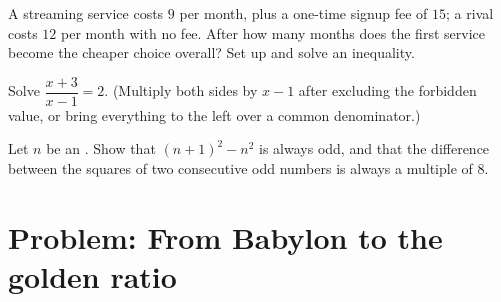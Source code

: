 \begin{exercise}[$\star\star$]\label{exo:g10:algebra:9}
A streaming service costs $9$ per month, plus a one-time signup fee of
$15$; a rival costs $12$ per month with no fee. After how many months does
the first service become the cheaper choice overall? Set up and solve an
inequality.
\end{exercise}

\begin{exercise}[$\star\star$]\label{exo:g10:algebra:10}
Solve $\dfrac{x+3}{x-1} = 2$. (Multiply both sides by $x - 1$ after
excluding the forbidden value, or bring everything to the left over a
common denominator.)
\end{exercise}

\begin{exercise}[$\star\star\star$]\label{exo:g10:algebra:11}
Let $n$ be an . Show that $(n + 1)^2 - n^2$ is always odd, and that
the difference between the squares of two consecutive odd numbers is
always a multiple of $8$.
\end{exercise}

\section{Problem: From Babylon to the golden ratio}

